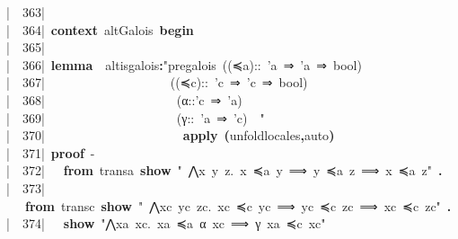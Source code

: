 \documentclass{article}
\newcommand{\syntaxKEYWORDA}[1]{\textcolor[rgb]{0.0,0.4,0.6}{\textbf{#1}}}
\newcommand{\syntaxKEYWORDB}[1]{\textcolor[rgb]{0.0,0.6,0.4}{\textbf{#1}}}
\newcommand{\syntaxKEYWORDC}[1]{\textcolor[rgb]{0.0,0.6,1.0}{\textbf{#1}}}
\newcommand{\syntaxLITERALA}[1]{\textcolor[rgb]{1.0,0.0,0.8}{#1}}
\newcommand{\syntaxOPERATOR}[1]{\textcolor[rgb]{0.0,0.0,0.0}{\textbf{#1}}}
\newcommand{\syntaxKEYWORDA}[1]{\textcolor[rgb]{0.0,0.4,0.6}{\textbf{#1}}}
\newcommand{\syntaxKEYWORDB}[1]{\textcolor[rgb]{0.0,0.6,0.4}{\textbf{#1}}}
\newcommand{\syntaxKEYWORDC}[1]{\textcolor[rgb]{0.0,0.6,1.0}{\textbf{#1}}}
\newcommand{\syntaxLITERALA}[1]{\textcolor[rgb]{1.0,0.0,0.8}{#1}}
\newcommand{\syntaxOPERATOR}[1]{\textcolor[rgb]{0.0,0.0,0.0}{\textbf{#1}}}
\newcommand{\syntaxKEYWORDA}[1]{\textcolor[rgb]{0.0,0.4,0.6}{\textbf{#1}}}
\newcommand{\syntaxKEYWORDB}[1]{\textcolor[rgb]{0.0,0.6,0.4}{\textbf{#1}}}
\newcommand{\syntaxKEYWORDC}[1]{\textcolor[rgb]{0.0,0.6,1.0}{\textbf{#1}}}
\newcommand{\syntaxLITERALA}[1]{\textcolor[rgb]{1.0,0.0,0.8}{#1}}
\newcommand{\syntaxOPERATOR}[1]{\textcolor[rgb]{0.0,0.0,0.0}{\textbf{#1}}}
\newcommand{\syntaxKEYWORDA}[1]{\textcolor[rgb]{0.0,0.4,0.6}{#1}}
\newcommand{\syntaxKEYWORDB}[1]{\textcolor[rgb]{0.0,0.6,0.4}{#1}}
\newcommand{\syntaxKEYWORDC}[1]{\textcolor[rgb]{0.0,0.6,1.0}{#1}}
\newcommand{\syntaxLITERALA}[1]{\textcolor[rgb]{1.0,0.0,0.8}{\textbf{#1}}}
\newcommand{\syntaxOPERATOR}[1]{\textcolor[rgb]{0.0,0.0,0.0}{#1}}
\newcommand{\syntaxKEYWORDA}[1]{\textcolor[rgb]{0.0,0.4,0.6}{\textbf{#1}}}
\newcommand{\syntaxKEYWORDB}[1]{\textcolor[rgb]{0.0,0.6,0.4}{\textbf{#1}}}
\newcommand{\syntaxKEYWORDC}[1]{\textcolor[rgb]{0.0,0.6,1.0}{\textbf{#1}}}
\newcommand{\syntaxLITERALA}[1]{\textcolor[rgb]{1.0,0.0,0.8}{#1}}
\newcommand{\syntaxOPERATOR}[1]{\textcolor[rgb]{0.0,0.0,0.0}{\textbf{#1}}}
\newcommand{\syntaxKEYWORDA}[1]{\textcolor[rgb]{0.0,0.4,0.6}{\textbf{#1}}}
\newcommand{\syntaxKEYWORDB}[1]{\textcolor[rgb]{0.0,0.6,0.4}{\textbf{#1}}}
\newcommand{\syntaxKEYWORDC}[1]{\textcolor[rgb]{0.0,0.6,1.0}{\textbf{#1}}}
\newcommand{\syntaxLITERALA}[1]{\textcolor[rgb]{1.0,0.0,0.8}{#1}}
\newcommand{\syntaxOPERATOR}[1]{\textcolor[rgb]{0.0,0.0,0.0}{\textbf{#1}}}
\newcommand{\syntaxKEYWORDA}[1]{\textcolor[rgb]{0.0,0.0,0.0}{#1}}
\newcommand{\syntaxKEYWORDB}[1]{\textcolor[rgb]{0.0,0.0,0.0}{#1}}
\newcommand{\syntaxKEYWORDC}[1]{\textcolor[rgb]{0.0,0.0,0.0}{#1}}
\newcommand{\gutter}[1]{\textcolor[rgb]{0,0,0}{{|}#1}}
\newcommand{\gutterH}[1]{\textcolor[rgb]{1,0,0}{{|}#1}}
\begin{document}
\gutter{\ \ 363{|}\ }\hspace*{\fill}\\
\gutter{\ \ 364{|}\ }\syntaxKEYWORDA{context}{\ }altGalois{\ }\syntaxKEYWORDB{begin}\hspace*{\fill}\\
\gutterH{\ \ 365{|}\ }\hspace*{\fill}\\
\gutter{\ \ 366{|}\ }\syntaxKEYWORDA{lemma}{\ }{\ }alt\usebox{\underscorebox}is\usebox{\underscorebox}galois\syntaxOPERATOR{:}\syntaxLITERALA{"pre\usebox{\underscorebox}galois{\ }((≼a)::{\ }'a{\ }⇒{\ }'a{\ }⇒{\ }bool){\ }{\ }}\hspace*{\fill}\\
\gutter{\ \ 367{|}\ }\syntaxLITERALA{{\ }{\ }{\ }{\ }{\ }{\ }{\ }{\ }{\ }{\ }{\ }{\ }{\ }{\ }{\ }{\ }{\ }{\ }{\ }((≼c)::{\ }'c{\ }⇒{\ }'c{\ }⇒{\ }bool){\ }{\ }}\hspace*{\fill}\\
\gutter{\ \ 368{|}\ }\syntaxLITERALA{{\ }{\ }{\ }{\ }{\ }{\ }{\ }{\ }{\ }{\ }{\ }{\ }{\ }{\ }{\ }{\ }{\ }{\ }{\ }{\ }(α::'c{\ }⇒{\ }'a){\ }}\hspace*{\fill}\\
\gutter{\ \ 369{|}\ }\syntaxLITERALA{{\ }{\ }{\ }{\ }{\ }{\ }{\ }{\ }{\ }{\ }{\ }{\ }{\ }{\ }{\ }{\ }{\ }{\ }{\ }{\ }(γ::{\ }'a{\ }⇒{\ }'c){\ }{\ }"}\hspace*{\fill}\\
\gutterH{\ \ 370{|}\ }{\ }{\ }{\ }{\ }{\ }{\ }{\ }{\ }{\ }{\ }{\ }{\ }{\ }{\ }{\ }{\ }{\ }{\ }{\ }{\ }{\ }\syntaxKEYWORDA{apply}{\ }\syntaxOPERATOR{(}unfold\usebox{\underscorebox}locales\syntaxOPERATOR{,}auto\syntaxOPERATOR{)}\hspace*{\fill}\\
\gutter{\ \ 371{|}\ }\syntaxKEYWORDA{proof}{\ }{-}\hspace*{\fill}\\
\gutter{\ \ 372{|}\ }{\ }{\ }\syntaxKEYWORDA{from}{\ }transa{\ }\syntaxKEYWORDC{show}{\ }\syntaxLITERALA{"{\ }⋀x{\ }y{\ }z.{\ }x{\ }≼a{\ }y{\ }⟹{\ }y{\ }≼a{\ }z{\ }⟹{\ }x{\ }≼a{\ }z"}{\ }\syntaxKEYWORDA{.}\hspace*{\fill}\\
\gutter{\ \ 373{|}\ }{\ }{\ }\syntaxKEYWORDA{from}{\ }transc{\ }\syntaxKEYWORDC{show}{\ }\syntaxLITERALA{"{\ }⋀xc{\ }yc{\ }zc.{\ }xc{\ }≼c{\ }yc{\ }⟹{\ }yc{\ }≼c{\ }zc{\ }⟹{\ }xc{\ }≼c{\ }zc"}{\ }\syntaxKEYWORDA{.}\hspace*{\fill}\\
\gutter{\ \ 374{|}\ }{\ }{\ }\syntaxKEYWORDC{show}{\ }\syntaxLITERALA{"⋀xa{\ }xc.{\ }xa{\ }≼a{\ }α{\ }xc{\ }⟹{\ }γ{\ }xa{\ }≼c{\ }xc"}\hspace*{\fill}\\
\end{document}
